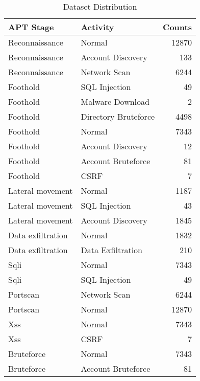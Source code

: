 \begin{table}
\centering
\caption{Dataset Distribution}
\label{Hunt2021Distribution}
\begin{tabular}{llr}
\toprule
         APT Stage &              Activity &  Counts \\
\midrule
    Reconnaissance &                Normal &   12870 \\
    Reconnaissance &     Account Discovery &     133 \\
    Reconnaissance &          Network Scan &    6244 \\
          Foothold &         SQL Injection &      49 \\
          Foothold &      Malware Download &       2 \\
          Foothold &  Directory Bruteforce &    4498 \\
          Foothold &                Normal &    7343 \\
          Foothold &     Account Discovery &      12 \\
          Foothold &    Account Bruteforce &      81 \\
          Foothold &                  CSRF &       7 \\
  Lateral movement &                Normal &    1187 \\
  Lateral movement &         SQL Injection &      43 \\
  Lateral movement &     Account Discovery &    1845 \\
 Data exfiltration &                Normal &    1832 \\
 Data exfiltration &     Data Exfiltration &     210 \\
              Sqli &                Normal &    7343 \\
              Sqli &         SQL Injection &      49 \\
          Portscan &          Network Scan &    6244 \\
          Portscan &                Normal &   12870 \\
               Xss &                Normal &    7343 \\
               Xss &                  CSRF &       7 \\
        Bruteforce &                Normal &    7343 \\
        Bruteforce &    Account Bruteforce &      81 \\
\bottomrule
\end{tabular}
\end{table}

